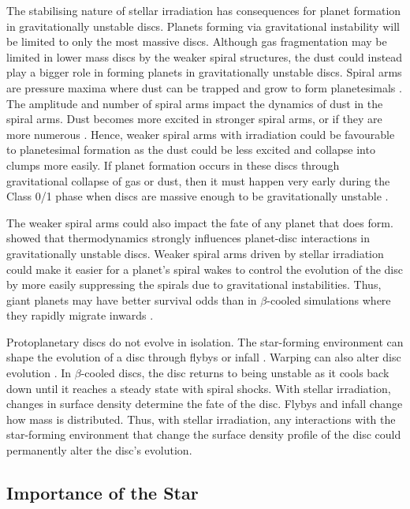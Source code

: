 \documentclass[usenatbib]{mnras}
\begin{document}
The stabilising nature of stellar irradiation has consequences for planet formation in gravitationally unstable discs. Planets forming via gravitational instability will be limited to only the most massive discs. Although gas fragmentation may be limited in lower mass discs by the weaker spiral structures, the dust could instead play a bigger role in forming planets in gravitationally unstable discs. Spiral arms are pressure maxima where dust can be trapped and grow to form planetesimals \citep{2004Rice,2006Rice,2012Gibbons,2016Booth,2020Elbakyan,2021Baehr,2022Baehr,2024Rowther}. The amplitude and number of spiral arms impact the dynamics of dust in the spiral arms. Dust becomes more excited in stronger spiral arms, or if they are more numerous \citep{2023Longarini,2023bLongarini}. Hence, weaker spiral arms with irradiation could be favourable to planetesimal formation as the dust could be less excited and collapse into clumps more easily. If planet formation occurs in these discs through gravitational collapse of gas or dust, then it must happen very early during the Class 0/1 phase when discs are massive enough to be gravitationally unstable \citep{2022Xu}.

The weaker spiral arms could also impact the fate of any planet that does form. \cite{2020Rowther,2020bRowther,2022bRowther} showed that thermodynamics strongly influences planet-disc interactions in gravitationally unstable discs. Weaker spiral arms driven by stellar irradiation could make it easier for a planet's spiral wakes to control the evolution of the disc by more easily suppressing the spirals due to gravitational instabilities. Thus, giant planets may have better survival odds than in $\beta$-cooled simulations where they rapidly migrate inwards \citep{2011Baruteau,2015Malik}. 

Protoplanetary discs do not evolve in isolation. The star-forming environment can shape the evolution of a disc through flybys or infall \citep{2018Bate}. Warping can also alter disc evolution \citep{2022Rowther}. In $\beta$-cooled discs, the disc returns to being unstable as it cools back down until it reaches a steady state with spiral shocks. With stellar irradiation, changes in surface density determine the fate of the disc. Flybys and infall change how mass is distributed. Thus, with stellar irradiation, any interactions with the star-forming environment that change the surface density profile of the disc could permanently alter the disc's evolution. 

\subsection{Importance of the Star}
\end{document}
